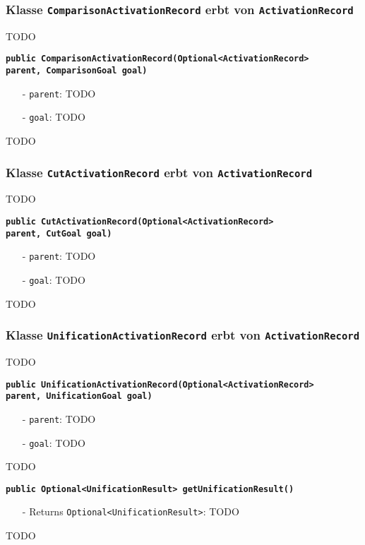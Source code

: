 \documentclass[parskip=full,11pt,twoside]{scrartcl}
\begin{document}
\subsubsection{Klasse \texttt{ComparisonActivationRecord} erbt von \texttt{ActivationRecord}}
TODO

\textbf{\texttt{public ComparisonActivationRecord(Optional<ActivationRecord>\\ parent, ComparisonGoal goal)}}
\begin{itemize}[noitemsep]
	\item[-] \texttt{parent}: TODO
	\item[-] \texttt{goal}: TODO
\end{itemize}
TODO

\subsubsection{Klasse \texttt{CutActivationRecord} erbt von \texttt{ActivationRecord}}
TODO

\textbf{\texttt{public CutActivationRecord(Optional<ActivationRecord>\\ parent, CutGoal goal)}}
\begin{itemize}[noitemsep]
	\item[-] \texttt{parent}: TODO
	\item[-] \texttt{goal}: TODO
\end{itemize}
TODO

\subsubsection{Klasse \texttt{UnificationActivationRecord} erbt von \texttt{ActivationRecord}}
TODO

\textbf{\texttt{public UnificationActivationRecord(Optional<ActivationRecord>\\ parent, UnificationGoal goal)}}
\begin{itemize}[noitemsep]
	\item[-] \texttt{parent}: TODO
	\item[-] \texttt{goal}: TODO
\end{itemize}
TODO

\textbf{\texttt{public Optional<UnificationResult> getUnificationResult()}}
\begin{itemize}[noitemsep]
	\item[-] Returns \texttt{Optional<UnificationResult>}: TODO
\end{itemize}
TODO
\end{document}
